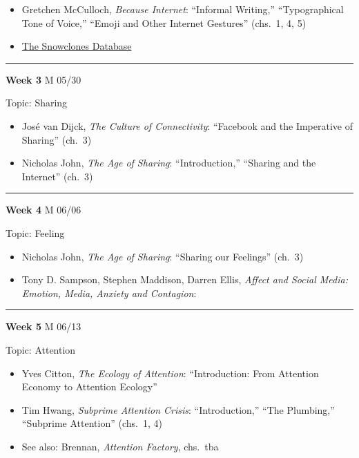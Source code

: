 \documentclass[]{tufte-handout}
\providecommand{\tightlist}{%
  \setlength{\itemsep}{0pt}\setlength{\parskip}{0pt}}
\begin{document}
\begin{itemize}
\tightlist
\item
  Gretchen McCulloch, \emph{Because Internet}: ``Informal Writing,''
  ``Typographical Tone of Voice,'' ``Emoji and Other Internet Gestures''
  (chs.~1, 4, 5)\\
\item
  \href{https://snowclones.org/about/}{The Snowclones Database}
\end{itemize}

\begin{center}\rule{0.5\linewidth}{0.5pt}\end{center}

\textbf{Week 3} M 05/30

Topic: Sharing

\begin{itemize}
\tightlist
\item
  José van Dijck, \emph{The Culture of Connectivity}: ``Facebook and the
  Imperative of Sharing'' (ch.~3)\\
\item
  Nicholas John, \emph{The Age of Sharing}: ``Introduction,'' ``Sharing
  and the Internet'' (ch.~3)
\end{itemize}

\begin{center}\rule{0.5\linewidth}{0.5pt}\end{center}

\textbf{Week 4} M 06/06

Topic: Feeling

\begin{itemize}
\tightlist
\item
  Nicholas John, \emph{The Age of Sharing}: ``Sharing our Feelings''
  (ch.~3)\\
\item
  Tony D. Sampson, Stephen Maddison, Darren Ellis, \emph{Affect and
  Social Media: Emotion, Media, Anxiety and Contagion}:
\end{itemize}

\begin{center}\rule{0.5\linewidth}{0.5pt}\end{center}

\textbf{Week 5} M 06/13

Topic: Attention

\begin{itemize}
\tightlist
\item
  Yves Citton, \emph{The Ecology of Attention}: ``Introduction: From
  Attention Economy to Attention Ecology''\\
\item
  Tim Hwang, \emph{Subprime Attention Crisis}: ``Introduction,'' ``The
  Plumbing,'' ``Subprime Attention'' (chs.~1, 4)\\
\item
  See also: Brennan, \emph{Attention Factory}, chs.~tba
\end{itemize}
\end{document}
